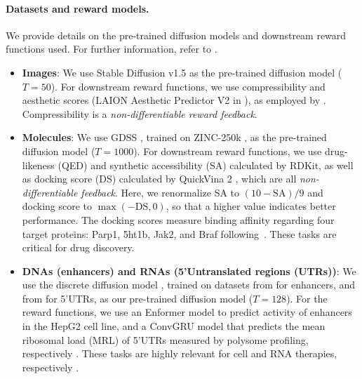 \vspace{-2mm}
\paragraph{Datasets and reward models. } We provide details on the pre-trained diffusion models and downstream reward functions used. For further information, refer to . 

\vspace{-2mm}
\begin{itemize}[leftmargin=*]
    \item \textbf{Images}: We use Stable Diffusion v1.5 as the pre-trained diffusion model ($T=50$). For downstream reward functions, we use compressibility and aesthetic scores (LAION Aesthetic Predictor V2 in \citet{schuhmann2022laion}), as employed by \citet{black2023training,fan2023dpok}. Compressibility is a \emph{non-differentiable reward feedback}.
    \item \textbf{Molecules}:  We use GDSS \citep{jo2022score}, trained on ZINC-250k \citep{irwin2005zinc}, as the pre-trained diffusion model ($T=1000$). For downstream reward functions, we use drug-likeness (QED) and synthetic accessibility (SA) calculated by RDKit, as well as docking score (DS) calculated by QuickVina 2 \citep{alhossary2015fast}, which are all \emph{non-differentiable feedback}. Here, we renormalize SA to $(10 - \mathrm{SA}) / 9$ and docking score to $\max(-\mathrm{DS}, 0)$, so that a higher value indicates better performance. The docking scores measure binding affinity regarding four target proteins: Parp1, 5ht1b, Jak2, and Braf following~\cite{yang2021hit}. These tasks are critical for drug discovery. 
    \item \textbf{DNAs (enhancers) and RNAs (5'Untranslated regions (UTRs))}: We use the discrete diffusion model \citep{sahoo2024simple}, trained on datasets from \citet{gosai2023machine} for enhancers, and from  \citet{sample2019human} for 5'UTRs, as our pre-trained diffusion model ($T=128$). For the reward functions, we use an Enformer model \citep{avsec2021effective} to predict activity of enhancers in the HepG2 cell line, and a ConvGRU model that predicts the mean ribosomal load (MRL) of 5'UTRs measured by polysome profiling, respectively \citep{sample2019human}. 
These tasks are highly relevant for cell and RNA therapies, respectively \citep{taskiran2024cell,castillo2021machine}. 
\end{itemize} 

\vspace{-2mm}
